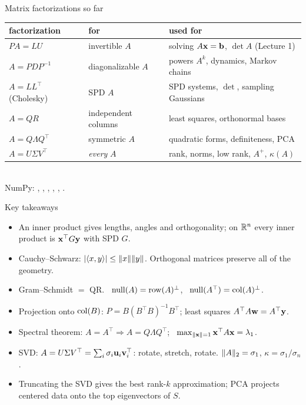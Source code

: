 \documentclass[aspectratio=1610,11pt]{beamer}
\begin{document}
\begin{frame}{Matrix factorizations so far}
    \small
    \renewcommand{\arraystretch}{1.25}
    \begin{tabular}{@{}lll@{}}
        \toprule
        factorization & for & used for \\
        \midrule
        $PA = LU$ & invertible $A$ & solving $A\mathbf{x} = \mathbf{b}$, $\det A$ (Lecture 1) \\
        $A = PDP^{-1}$ & diagonalizable $A$ & powers $A^k$, dynamics, Markov chains \\
        $A = LL^\top$ (Cholesky) & SPD $A$ & SPD systems, $\det$, sampling Gaussians \\
        $A = QR$ & independent columns & least squares, orthonormal bases \\
        $A = Q\Lambda Q^\top$ & symmetric $A$ & quadratic forms, definiteness, PCA \\
        $A = U\Sigma V^\top$ & \emph{every} $A$ & rank, norms, low rank, $A^+$, $\kappa(A)$ \\
        \bottomrule
    \end{tabular}
    \\[1em]
    NumPy: , , , , , .
\end{frame}

\begin{frame}{Key takeaways}
    \small
    \begin{itemize}
        \item An inner product gives lengths, angles and orthogonality; on $\mathbb{R}^n$ every inner product is $\mathbf{x}^\top G\mathbf{y}$ with SPD $G$.
        \item Cauchy--Schwarz: $|\langle x, y \rangle| \leq \lVert x \rVert\lVert y \rVert$. Orthogonal matrices preserve all of the geometry.
        \item Gram--Schmidt $=$ QR. \ $\operatorname{null}(A) = \operatorname{row}(A)^\perp$, \ $\operatorname{null}(A^\top) = \operatorname{col}(A)^\perp$.
        \item Projection onto $\operatorname{col}(B)$: $P = B(B^\top B)^{-1}B^\top$; least squares $A^\top A\mathbf{w} = A^\top\mathbf{y}$.
        \item Spectral theorem: $A = A^\top \Rightarrow A = Q\Lambda Q^\top$; \ $\max_{\lVert \mathbf{x} \rVert = 1}\mathbf{x}^\top A\mathbf{x} = \lambda_1$.
        \item SVD: $A = U\Sigma V^\top = \sum_i\sigma_i\mathbf{u}_i\mathbf{v}_i^\top$: rotate, stretch, rotate. $\lVert A \rVert_2 = \sigma_1$, $\kappa = \sigma_1/\sigma_n$.
        \item Truncating the SVD gives the best rank-$k$ approximation; PCA projects centered data onto the top eigenvectors of $S$.
    \end{itemize}
\end{frame}
\end{document}
